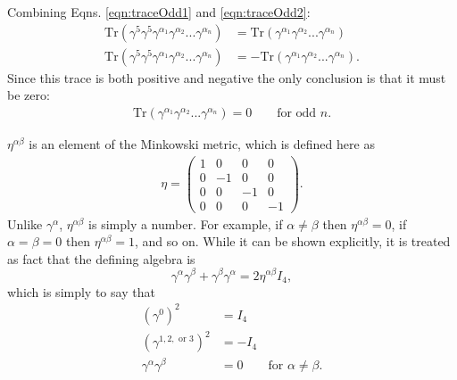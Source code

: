 Combining Eqns. \ref{eqn:traceOdd1} and \ref{eqn:traceOdd2}:
\begin{align*}
\text{Tr}(\gamma^5 \gamma^5 \gamma^{\alpha_1} \gamma^{\alpha_2} ...
\gamma^{\alpha_n})&=\text{Tr}(\gamma^{\alpha_1} \gamma^{\alpha_2} ...
\gamma^{\alpha_n})
\\
\text{Tr}(\gamma^5 \gamma^5 \gamma^{\alpha_1} \gamma^{\alpha_2} ...
\gamma^{\alpha_n})&=-\text{Tr}(\gamma^{\alpha_1} \gamma^{\alpha_2} ...
\gamma^{\alpha_n}).
\end{align*}
Since this trace is both positive and negative the only conclusion is that it
must be zero:
\begin{align}\label{eqn:griffithsRule10}
\text{Tr}(\gamma^{\alpha_1} \gamma^{\alpha_2} ... \gamma^{\alpha_n})=0 \qquad \text{for
odd $n$.}
\end{align}

\label{ssc:griffithsRule12}

$\eta^{\alpha\beta}$ is an element of the Minkowski metric, which is defined here as
\begin{align*}
\eta=
\begin{pmatrix}
1 & 0 & 0 & 0 \\
0 & -1 & 0 & 0\\
0 & 0 & -1 & 0\\
0 & 0 & 0 & -1
\end{pmatrix}.
\end{align*}
Unlike $\gamma^\alpha$, $\eta^{\alpha\beta}$ is simply a number. For example, if
$\alpha\neq\beta$
then $\eta^{\alpha\beta}=0$, if $\alpha=\beta=0$ then $\eta^{\alpha\beta}=1$, and so
on. While it can be
shown explicitly, it is treated as fact that the defining algebra is
\begin{equation}\label{eqn:cliffordAlgebra}
\gamma^\alpha\gamma^\beta + \gamma^\beta \gamma^\alpha=2\eta^{\alpha\beta}I_4,
\end{equation}
which is simply to say that 
\begin{align*}
(\gamma^0)^2&=I_4\\
(\gamma^{1,2, \text{ or }3})^2&=-I_4\\
\gamma^\alpha\gamma^\beta&=0 \qquad \text{for }\alpha\neq\beta.
\end{align*}

